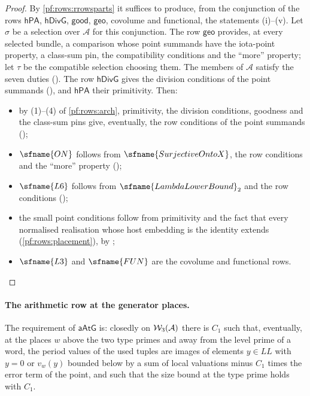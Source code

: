 \begin{proof}
By \cref{pf:rows:rrowsparts} it suffices to produce, from the conjunction of the rows $\mathsf{hPA}$, $\mathsf{hDivG}$,
$\mathsf{good}$, $\mathsf{geo}$, covolume and functional, the statements (i)--(v). Let $\sigma$ be a selection over $\mathcal A$
for this conjunction. The row $\mathsf{geo}$ provides, at every selected bundle, a comparison whose point summands have the
iota-point property, a class-sum pin, the compatibility conditions and the ``more'' property; let $\tau$ be the
compatible selection choosing them. The members of $\mathcal A$ satisfy the seven duties
(). The row $\mathsf{hDivG}$ gives the division
conditions of the point summands (), and $\mathsf{hPA}$ their
primitivity. Then:
\begin{itemize}
\item by (1)--(4) of \cref{pf:rows:arch}, primitivity, the division conditions, goodness and the class-sum pins give,
eventually, the row conditions of the point summands ();
\item $\sfname{ON}$ follows from $\sfname{SurjectiveOntoX}$, the row conditions and the ``more'' property
();
\item $\sfname{L6}$ follows from $\sfname{LambdaLowerBound}_2$ and the row conditions
();
\item the small point conditions follow from primitivity and the fact that every normalised realisation whose host
embedding is the identity extends (\cref{pf:rows:placement}), by
;
\item $\sfname{L3}$ and $\sfname{FUN}$ are the covolume and functional rows.\qedhere
\end{itemize}
\end{proof}

\paragraph{The arithmetic row at the generator places.}
The requirement of $\mathsf{aAtG}$ is: closedly on $\mathcal{W}_3(\mathcal A)$ there is $C_1$ such that, eventually, at the places
$w$ above the two type primes and away from the level prime of a word, the period values of the used tuples are images of
elements $y\in\mathit{LL}$ with $y=0$ or $v_w(y)$ bounded below by a sum of local valuations minus $C_1$ times the error term
of the point, and such that the size bound at the type prime holds with $C_1$.

